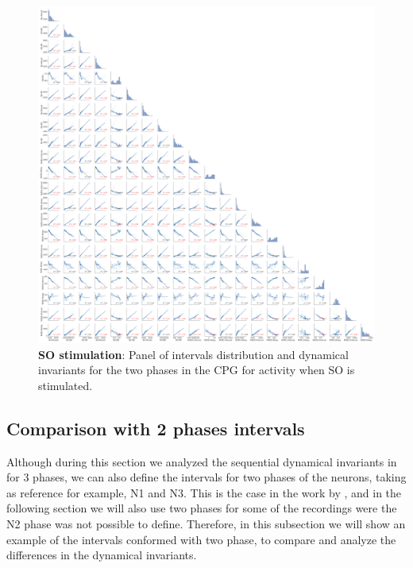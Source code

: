 \begin{figure}[htbp]
	\centering
	\includegraphics[width=\textwidth]{./invariants/data/MODEL/so_driven/images/3phases/_output_pairplot.png}
	\caption{\textbf{SO stimulation}: Panel of intervals distribution and dynamical invariants for the two phases in the CPG for activity when SO is stimulated.}
	\label{fig:model so stimulation pairplot}
\end{figure}


\subsection{Comparison with 2 phases intervals}
Although during this section we analyzed the sequential dynamical invariants in for 3 phases, we can also define the intervals for two phases of the neurons, taking as reference for example, N1 and N3. This is the case in the work by \cite{elices_robust_2019}, and in the following section we will also use two phases for some of the recordings were the N2 phase was not possible to define. Therefore, in this subsection we will show an example of the intervals conformed with two phase, to compare and analyze the differences in the dynamical invariants. 



